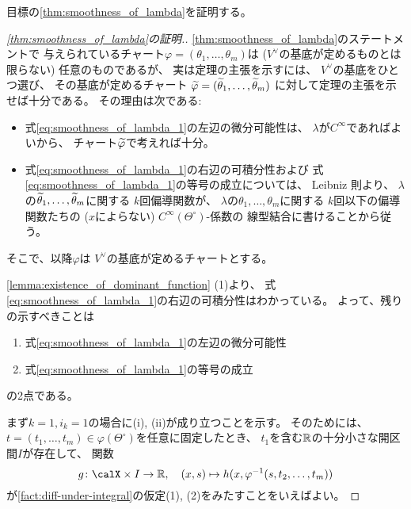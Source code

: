 \documentclass[report]{jlreq}
\begin{document}
目標の\cref{thm:smoothness_of_lambda}を証明する。

\begin{proof}[\cref{thm:smoothness_of_lambda}の証明.]
    \cref{thm:smoothness_of_lambda}のステートメントで
    与えられているチャート$\varphi = (\theta_1, \dots, \theta_m)$は
    ($V^\vee$の基底が定めるものとは限らない)
    任意のものであるが、
    実は定理の主張を示すには、
    $V^\vee$の基底をひとつ選び、
    その基底が定めるチャート
    $\widetilde{\varphi} = (\widetilde{\theta}_1, \dots, \widetilde{\theta}_m)$
    に対して定理の主張を示せば十分である。
    その理由は次である:
    \begin{itemize}
        \item 式\cref{eq:smoothness_of_lambda_1}の左辺の微分可能性は、
            $\lambda$が$C^\infty$であればよいから、
            チャート$\widetilde{\varphi}$で考えれば十分。
        \item 式\cref{eq:smoothness_of_lambda_1}の右辺の可積分性および
            式\cref{eq:smoothness_of_lambda_1}の等号の成立については、
            Leibniz 則より、
            $\lambda$の$\widetilde{\theta}_1, \dots, \widetilde{\theta}_m$に関する
            $k$回偏導関数が、
            $\lambda$の$\theta_1, \dots, \theta_m$に関する
            $k$回以下の偏導関数たちの
            ($x$によらない) $C^\infty(\Theta^\circ)$-係数の
            線型結合に書けることから従う。
    \end{itemize}
    そこで、以降$\varphi$は
    $V^\vee$の基底が定めるチャートとする。

    \cref{lemma:existence_of_dominant_function} (1)より、
    式\cref{eq:smoothness_of_lambda_1}の右辺の可積分性はわかっている。
    よって、残りの示すべきことは
    \begin{enumerate}[label=(\roman*)]
        \item 式\cref{eq:smoothness_of_lambda_1}の左辺の微分可能性
        \item 式\cref{eq:smoothness_of_lambda_1}の等号の成立
    \end{enumerate}
    の2点である。

    まず$k = 1, i_k = 1$の場合に(i), (ii)が成り立つことを示す。
    そのためには、
    $t = (t_1, \dots, t_m) \in \varphi(\Theta^\circ)$を任意に固定したとき、
    $t_1$を含む$\mathbb{R}$の十分小さな開区間$I$が存在して、
    関数
    \begin{equation}
        \locallabel{eq:h_restriction}
        g \colon \calX \times I \to \R,
            \quad
            (x, s) \mapsto h(x, \varphi^{-1}(s, t_2, \dots, t_m))
    \end{equation}
    が\cref{fact:diff-under-integral}の仮定(1), (2)をみたすことをいえばよい。


\end{proof}
\end{document}
